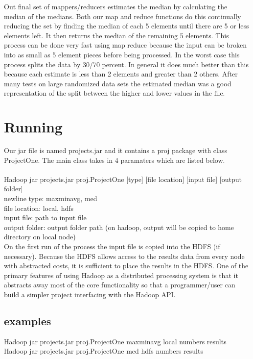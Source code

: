 \documentclass[11pt]{article}
\begin{document}
Out final set of mappers/reducers estimates the median by calculating the median of the medians.  Both our map and reduce functions do this continually reducing the set by finding the median of each 5 elements until there are 5 or less elements left.  It then returns the median of the remaining 5 elements.  This process can be done very fast using map reduce because the input can be broken into as small as 5 element pieces before being processed.  In the worst case this process splits the data by 30/70 percent.  In general it does much better than this because each estimate is less than 2 elements and greater than 2 others.  After many tests on large randomized data sets the estimated median was a good representation of the split between the higher and lower values in the file.

\section{Running}
Our jar file is named projects.jar and it contains a proj package with class ProjectOne.  The main class takes in 4 paramaters which are listed below.\\\\
Hadoop jar projects.jar proj.ProjectOne [type] [file location] [input file] [output folder]\\
newline type: maxminavg, med\\
file location: local, hdfs\\
input file: path to input file\\
output folder: output folder path (on hadoop, output will be copied to home directory on local node)\\

On the first run of the process the input file is copied into the HDFS (if necessary).  Because the HDFS allows access to the results data from every node with abstracted costs, it is sufficient to place the results in the HDFS.  One of the primary features of using Hadoop as a distributed processing system is that it abstracts away most of the core functionality so that a programmer/user can build a simpler project interfacing with the Hadoop API.

\subsection*{examples}
Hadoop jar projects.jar proj.ProjectOne maxminavg local numbers results\\
Hadoop jar projects.jar proj.ProjectOne med hdfs numbers results
\end{document}
